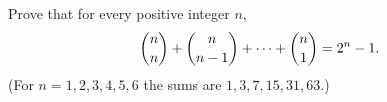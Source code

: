 Prove that for every positive integer $n$,
\[\dbinom nn+\dbinom n{n-1}+\cdots+\dbinom n1=2^n-1.\]
(For $n=1,2,3,4,5,6$ the sums are $1,3,7,15,31,63$.)
